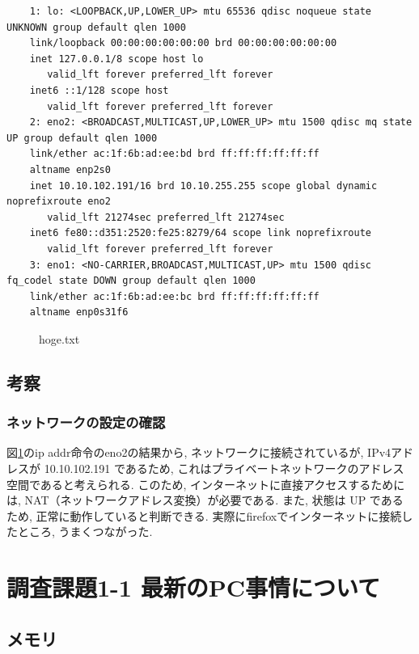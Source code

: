 \documentclass{ltjsarticle} %
\begin{document}
\begin{mdframed}
  \begin{verbatim}
    1: lo: <LOOPBACK,UP,LOWER_UP> mtu 65536 qdisc noqueue state UNKNOWN group default qlen 1000
    link/loopback 00:00:00:00:00:00 brd 00:00:00:00:00:00
    inet 127.0.0.1/8 scope host lo
       valid_lft forever preferred_lft forever
    inet6 ::1/128 scope host 
       valid_lft forever preferred_lft forever
    2: eno2: <BROADCAST,MULTICAST,UP,LOWER_UP> mtu 1500 qdisc mq state UP group default qlen 1000
    link/ether ac:1f:6b:ad:ee:bd brd ff:ff:ff:ff:ff:ff
    altname enp2s0
    inet 10.10.102.191/16 brd 10.10.255.255 scope global dynamic noprefixroute eno2
       valid_lft 21274sec preferred_lft 21274sec
    inet6 fe80::d351:2520:fe25:8279/64 scope link noprefixroute 
       valid_lft forever preferred_lft forever
    3: eno1: <NO-CARRIER,BROADCAST,MULTICAST,UP> mtu 1500 qdisc fq_codel state DOWN group default qlen 1000
    link/ether ac:1f:6b:ad:ee:bc brd ff:ff:ff:ff:ff:ff
    altname enp0s31f6	
  \end{verbatim}
  \end{mdframed}
  \begin{figure}[H]
  \caption{hoge.txt}
  \label{fig:hoge}
  \end{figure}


\subsection{考察}

\subsubsection{ネットワークの設定の確認}

図\ref{fig:hoge}のip addr命令のeno2の結果から, ネットワークに接続されているが, IPv4アドレスが 10.10.102.191 であるため, 
これはプライベートネットワークのアドレス空間であると考えられる. このため, インターネットに直接アクセスするためには, 
NAT（ネットワークアドレス変換）が必要である. また, 状態は UP であるため, 正常に動作していると判断できる. 
実際にfirefoxでインターネットに接続したところ, うまくつながった. 


\section{調査課題1-1 最新のPC事情について}

\subsection{メモリ}
\end{document}
